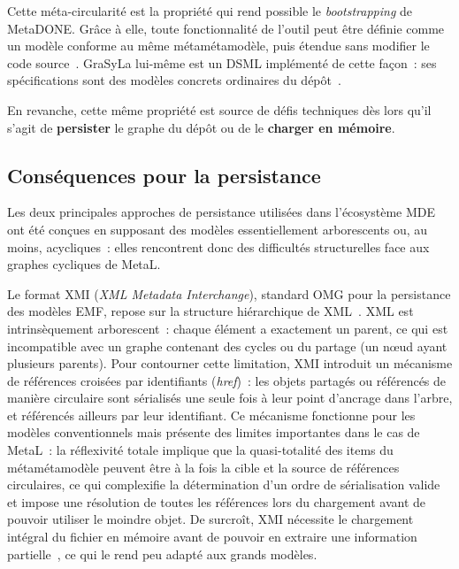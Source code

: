 Cette méta-circularité est la propriété qui rend possible le \textit{bootstrapping} de MetaDONE. Grâce à elle, toute fonctionnalité de l'outil peut être définie comme un modèle conforme au même métamétamodèle, puis étendue sans modifier le code source~\cite{Eng2007}. GraSyLa lui-même est un DSML implémenté de cette façon~: ses spécifications sont des modèles concrets ordinaires du dépôt~\cite{techreportgrasylaversion2}.


En revanche, cette même propriété est source de défis techniques dès lors qu'il s'agit de \textbf{persister} le graphe du dépôt ou de le \textbf{charger en mémoire}.

\subsection{Conséquences pour la persistance}
\label{sec:graphes-persistance}

Les deux principales approches de persistance utilisées dans l'écosystème MDE ont été conçues en supposant des modèles essentiellement arborescents ou, au moins, acycliques~: elles rencontrent donc des difficultés structurelles face aux graphes cycliques de MetaL.

Le format XMI (\textit{XML Metadata Interchange}), standard OMG pour la persistance des modèles EMF, repose sur la structure hiérarchique de XML~\cite{specification2007omg}. XML est intrinsèquement arborescent~: chaque élément a exactement un parent, ce qui est incompatible avec un graphe contenant des cycles ou du partage (un nœud ayant plusieurs parents). Pour contourner cette limitation, XMI introduit un mécanisme de références croisées par identifiants (\textit{href})~: les objets partagés ou référencés de manière circulaire sont sérialisés une seule fois à leur point d'ancrage dans l'arbre, et référencés ailleurs par leur identifiant. Ce mécanisme fonctionne pour les modèles conventionnels mais présente des limites importantes dans le cas de MetaL~: la réflexivité totale implique que la quasi-totalité des items du métamétamodèle peuvent être à la fois la cible et la source de références circulaires, ce qui complexifie la détermination d'un ordre de sérialisation valide et impose une résolution de toutes les références lors du chargement avant de pouvoir utiliser le moindre objet. De surcroît, XMI nécessite le chargement intégral du fichier en mémoire avant de pouvoir en extraire une information partielle~\cite{steinberg2008emf}, ce qui le rend peu adapté aux grands modèles.

